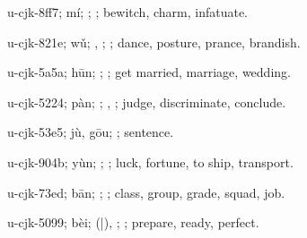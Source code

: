 \begin{multicols}{2}
{\cjkgGlue{}u-cjk-8ff7; mí; \cjkgGlue{}\cjkgGlue{}\cjkgGlue{}; \cjkgGlue{}; bewitch, charm, infatuate.

\cjkgGlue{}u-cjk-821e; wǔ; \cjkgGlue{}\cjkgGlue{}\cjkgGlue{}, \cjkgGlue{}; \cjkgGlue{}; dance, posture, prance, brandish.

\cjkgGlue{}u-cjk-5a5a; hūn; \cjkgGlue{}; \cjkgGlue{}; get married, marriage, wedding.

\cjkgGlue{}u-cjk-5224; pàn; \cjkgGlue{}\cjkgGlue{}\cjkgGlue{}; \cjkgGlue{}, \cjkgGlue{}; judge, discriminate, conclude.

\cjkgGlue{}u-cjk-53e5; jù, gōu; \cjkgGlue{}; sentence.

\cjkgGlue{}u-cjk-904b; yùn; \cjkgGlue{}\cjkgGlue{}\cjkgGlue{}; \cjkgGlue{}; luck, fortune, to ship, transport.

\cjkgGlue{}u-cjk-73ed; bān; \cjkgGlue{}; \cjkgGlue{}; class, group, grade, squad, job.

\cjkgGlue{}u-cjk-5099; bèi; \cjkgGlue{}\cjkgGlue{}(\cjkgGlue{}|\cjkgGlue{}), \cjkgGlue{}\cjkgGlue{}\cjkgGlue{}; \cjkgGlue{}; prepare, ready, perfect.

}
\end{multicols}
